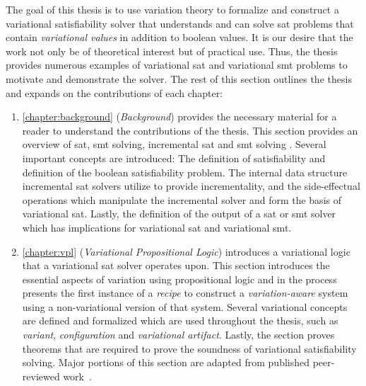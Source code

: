 \label{section:contributions}
%
The goal of this thesis is to use variation theory to formalize and construct a
variational satisfiability solver that understands and can solve \ac{sat}
problems that contain \emph{variational values} in addition to boolean values.
It is our desire that the work not only be of theoretical interest but of
practical use. Thus, the thesis provides numerous examples of variational
\ac{sat} and variational \ac{smt} problems to motivate and demonstrate the
solver. The rest of this section outlines the thesis and expands on the
contributions of each chapter:

  \begin{enumerate}
  \item \autoref{chapter:background} (\emph{Background}) provides the necessary
    material for a reader to understand the contributions of the thesis. This
    section provides an overview of \acl{sat}, \acl{smt} solving, incremental
    \ac{sat} and \ac{smt} solving . Several important concepts are introduced:
    The definition of satisfiability and definition of the boolean
    satisfiability problem. The internal data structure incremental \ac{sat}
    solvers utilize to provide incrementality, and the side-effectual operations
    which manipulate the incremental solver and form the basis of variational
    \acl{sat}. Lastly, the definition of the output of a \ac{sat} or \ac{smt}
    solver which has implications for variational \acl{sat} and variational
    \ac{smt}.

  \item \autoref{chapter:vpl} (\emph{Variational Propositional Logic})
    introduces a variational logic that a variational \ac{sat} solver operates
    upon. This section introduces the essential aspects of variation using
    propositional logic and in the process presents the first instance of a
    \emph{\recipe{} recipe} to construct a \emph{variation-aware} system using a
    non-variational version of that system. Several variational concepts are
    defined and formalized which are used throughout the thesis, such as
    \emph{variant}, \emph{configuration} and \emph{variational artifact}.
    Lastly, the section proves theorems that are required to prove the soundness
    of variational satisfiability solving. Major portions of this section are
    adapted from published peer-reviewed work~\cite{YWT:SPLC20}.


\end{enumerate}
